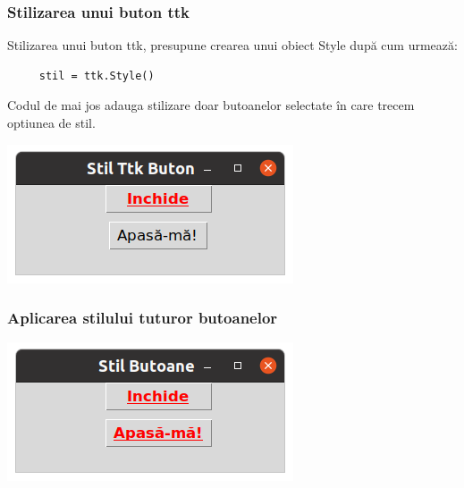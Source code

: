 \documentclass[12pt,a4paper]{book}
\begin{document}
\subsubsection{Stilizarea unui buton ttk}
Stilizarea unui buton ttk, presupune crearea unui obiect Style după cum urmează:
\begin{verbatim}
     stil = ttk.Style()
\end{verbatim}
Codul de mai jos adauga stilizare doar butoanelor selectate în care trecem optiunea de stil.

\includegraphics[width=\linewidth]{stilttkbuton.png}
\subsubsection{Aplicarea stilului tuturor butoanelor}

\includegraphics[width=\linewidth]{stilttkbuton02.png}
\end{document}
